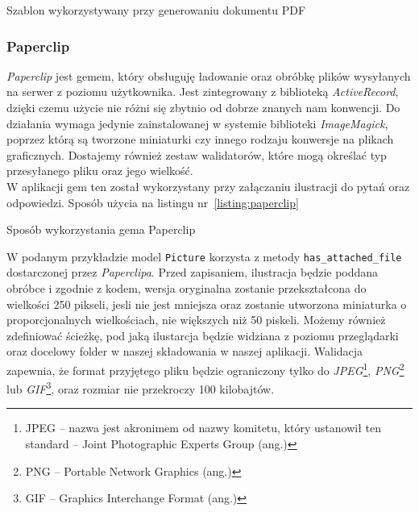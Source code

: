 \documentclass[a4paper,12pt]{article}
\begin{document}
\begin{listing}
  
  \caption{Szablon wykorzystywany przy generowaniu dokumentu PDF}
  \label{listing:prawn}
\end{listing}

\subsubsection{Paperclip}\label{sec:paperclip}
\emph{Paperclip} jest gemem, który obsługuję ładowanie oraz obróbkę plików wysyłanych na
serwer z poziomu użytkownika. Jest zintegrowany z biblioteką \emph{ActiveRecord}, dzięki
czemu użycie nie różni się zbytnio od dobrze znanych nam konwencji. Do działania wymaga
jedynie zainstalowanej w systemie biblioteki \emph{ImageMagick}, poprzez którą są tworzone
miniaturki czy innego rodzaju konwersje na plikach graficznych. Dostajemy również zestaw
walidatorów, które mogą określać typ przesyłanego pliku oraz jego wielkość.\\
W aplikacji gem ten został wykorzystany przy załączaniu ilustracji do pytań oraz odpowiedzi.
Sposób użycia na listingu nr~\ref{listing:paperclip}

\begin{listing}
  
  \caption{Sposób wykorzystania gema Paperclip}
  \label{listing:paperclip}
\end{listing}


W podanym przykładzie model \texttt{Picture} korzysta z metody \texttt{has\_attached\_file}
dostarczonej przez \emph{Paperclipa}. Przed zapisaniem, ilustracja będzie poddana obróbce
i zgodnie z kodem, wersja oryginalna zostanie przekształcona do wielkości 250 pikseli,
jesli nie jest mniejsza oraz zostanie utworzona miniaturka o proporcjonalnych
wielkościach, nie większych niż 50 piskeli. Możemy również zdefiniować ścieżkę, pod jaką
ilustarcja będzie widziana z poziomu przeglądarki oraz docelowy folder w naszej
składowania w naszej aplikacji. Walidacja zapewnia, że format przyjętego pliku będzie
ograniczony tylko do \emph{JPEG}\footnote{JPEG -- nazwa jest akronimem od nazwy komitetu,
który ustanowił ten standard -- Joint Photographic Experts Group (ang.)},
\emph{PNG}\footnote{PNG -- Portable Network Graphics (ang.)} lub \emph{GIF}\footnote{GIF --
Graphics Interchange Format (ang.)}, oraz rozmiar nie przekroczy 100 kilobajtów.
\end{document}
